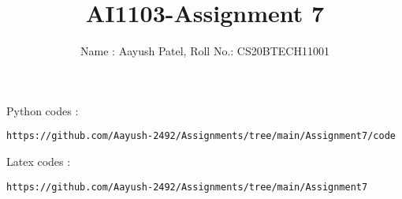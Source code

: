 \documentclass[journal,12pt,twocolumn]{IEEEtran}
\DeclareMathOperator*{\Res}{Res}
\begin{document}
\newcommand{\BEQA}{\begin{eqnarray}}
\newcommand{\EEQA}{\end{eqnarray}}
\newcommand{\define}{\stackrel{\triangle}{=}}

\raggedbottom
\setlength{\parindent}{0pt}
\providecommand{\mbf}{\mathbf}
\providecommand{\pr}[1]{\ensuremath{\Pr\left(#1\right)}}
\providecommand{\qfunc}[1]{\ensuremath{Q\left(#1\right)}}
\providecommand{\sbrak}[1]{\ensuremath{{}\left[#1\right]}}
\providecommand{\lsbrak}[1]{\ensuremath{{}\left[#1\right.}}
\providecommand{\rsbrak}[1]{\ensuremath{{}\left.#1\right]}}
\providecommand{\brak}[1]{\ensuremath{\left(#1\right)}}
\providecommand{\lbrak}[1]{\ensuremath{\left(#1\right.}}
\providecommand{\rbrak}[1]{\ensuremath{\left.#1\right)}}
\providecommand{\cbrak}[1]{\ensuremath{\left\{#1\right\}}}
\providecommand{\lcbrak}[1]{\ensuremath{\left\{#1\right.}}
\providecommand{\rcbrak}[1]{\ensuremath{\left.#1\right\}}}
\theoremstyle{remark}
\newtheorem{rem}{Remark}
\newcommand{\sgn}{\mathop{\mathrm{sgn}}}
\providecommand{\abs}[1]{\vert#1\vert}
\providecommand{\res}[1]{\Res\displaylimits_{#1}} 
\providecommand{\norm}[1]{\lVert#1\rVert}
\providecommand{\mtx}[1]{\mathbf{#1}}
\providecommand{\mean}[1]{E[ #1 ]}
\providecommand{\fourier}{\overset{\mathcal{F}}{ \rightleftharpoons}}
\providecommand{\system}{\overset{\mathcal{H}}{ \longleftrightarrow}}
\newcommand{\solution}{\noindent \textbf{Solution: }}
\newcommand{\cosec}{\,\text{cosec}\,}
\providecommand{\dec}[2]{\ensuremath{\overset{#1}{\underset{#2}{\gtrless}}}}
\newcommand{\myvec}[1]{\ensuremath{\begin{pmatrix}#1\end{pmatrix}}}
\newcommand{\mydet}[1]{\ensuremath{\begin{vmatrix}#1\end{vmatrix}}}
\makeatletter
{}
\makeatother
\let\StandardTheFigure\thefigure
\let\vec\mathbf
\renewcommand{\thefigure}{\theproblem}
\def\putbox#1#2#3{\makebox[0in][l]{\makebox[#1][l]{}\raisebox{\baselineskip}[0in][0in]{\raisebox{#2}[0in][0in]{#3}}}}
     \def\rightbox#1{\makebox[0in][r]{#1}}
     \def\centbox#1{\makebox[0in]{#1}}
     \def\topbox#1{\raisebox{-\baselineskip}[0in][0in]{#1}}
     \def\midbox#1{\raisebox{-0.5\baselineskip}[0in][0in]{#1}}
\vspace{3cm}
\title{AI1103-Assignment 7}
\author{Name : Aayush Patel, Roll No.: CS20BTECH11001}
\maketitle
\newpage
\bigskip
\renewcommand{\thefigure}{\theenumi}
\renewcommand{\thetable}{\theenumi}
Python codes : 
\begin{lstlisting}
https://github.com/Aayush-2492/Assignments/tree/main/Assignment7/code
\end{lstlisting}
%
Latex codes : 
%
\begin{lstlisting}
https://github.com/Aayush-2492/Assignments/tree/main/Assignment7
\end{lstlisting}
\end{document}
